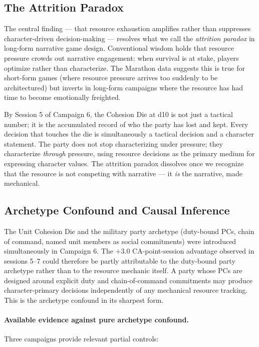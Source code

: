 \subsection{The Attrition Paradox}

The central finding --- that resource exhaustion amplifies rather than suppresses
character-driven decision-making --- resolves what we call the \textit{attrition paradox}
in long-form narrative game design. Conventional wisdom holds that resource pressure
crowds out narrative engagement: when survival is at stake, players optimize rather
than characterize. The Marathon data suggests this is true for short-form games
(where resource pressure arrives too suddenly to be architectured) but inverts in
long-form campaigns where the resource has had time to become emotionally freighted.

By Session 5 of Campaign 6, the Cohesion Die at d10 is not just a tactical number;
it is the accumulated record of who the party has lost and kept. Every decision that
touches the die is simultaneously a tactical decision and a character statement. The
party does not stop characterizing under pressure; they characterize \textit{through}
pressure, using resource decisions as the primary medium for expressing character
values. The attrition paradox dissolves once we recognize that the resource is not
competing with narrative --- it \textit{is} the narrative, made mechanical.

\subsection{Archetype Confound and Causal Inference}
\label{subsec:archetype-confound}

The Unit Cohesion Die and the military party archetype (duty-bound PCs, chain of command,
named unit members as social commitments) were introduced simultaneously in Campaign 6.
The $+3.0$ CA-point-session advantage observed in sessions 5--7 could therefore be
partly attributable to the duty-bound party archetype rather than to the resource mechanic
itself. A party whose PCs are designed around explicit duty and chain-of-command commitments
may produce character-primary decisions independently of any mechanical resource tracking.
This is the archetype confound in its sharpest form.

\paragraph{Available evidence against pure archetype confound.}
Three campaigns provide relevant partial controls:

